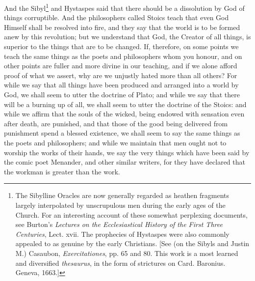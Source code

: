 And the Sibyl\footnote{The Sibylline Oracles are now generally regarded as heathen fragments largely interpolated by unscrupulous men during the early ages of the Church. For an interesting account of these somewhat perplexing documents, see Burton’s \emph{Lectures on the Ecclesiastical History of the First Three Centuries}, Lect. xvii. The prophecies of Hystaspes were also commonly appealed to as genuine by the early Christians. [See (on the Sibyls and Justin M.) Casaubon, \emph{Exercitationes}, pp. 65 and 80. This work is a most learned and diversified \emph{thesaurus}, in the form of strictures on Card. Baronius. Geneva, 1663.]} and Hystaspes said that there should be a dissolution by God of things corruptible. And the philosophers called Stoics teach that even God Himself shall be resolved into fire, and they say that the world is to be formed anew by this revolution; but we understand that God, the Creator of all things, is superior to the things that are to be changed. If, therefore, on some points we teach the same things as the poets and philosophers whom you honour, and on other points are fuller and more divine in our teaching, and if we alone afford proof of what we assert, why are we unjustly hated more than all others? For while we say that all things have been produced and arranged into a world by God, we shall seem to utter the doctrine of  Plato; and while we say that there will be a burning up of all, we shall seem to utter the doctrine of the Stoics: and while we affirm that the souls of the wicked, being endowed with sensation even after death, are punished, and that those of the good being delivered from punishment spend a blessed existence, we shall seem to say the same things as the poets and philosophers; and while we maintain that men ought not to worship the works of their hands, we say the very things which have been said by the comic poet Menander, and other similar writers, for they have declared that the workman is greater than the work.


